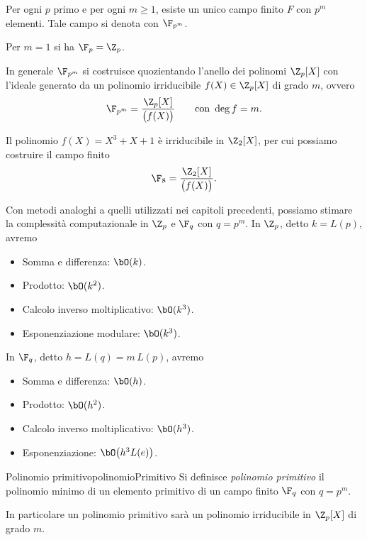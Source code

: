 	\begin{pr}
	Per ogni \(p\) primo e per ogni \(m\ge 1\), esiste un unico campo finito \(F\) con \(p^m\) elementi. Tale campo si denota con \(\F_{p^m}\).
	\end{pr}

	\begin{oss}
	Per \(m=1\) si ha \(\F_p=\Z_p\).
	\end{oss}
	\noindent
	In generale \(\F_{p^m}\) si costruisce quozientando l'anello dei polinomi \(\Z_p[X]\) con l'ideale generato da un polinomio irriducibile \(f(X)\in\Z_p[X]\) di grado \(m\), ovvero
		\[
		\F_{p^m} = \frac{\Z_p[X]}{\big(f(X)\big)} \qquad\text{con }\deg f = m.
		\]

	\begin{ese}
	Il polinomio \(f(X)=X^3+X+1\) è irriducibile in \(\Z_2[X]\), per cui possiamo costruire il campo finito
		\[
		\F_8 = \frac{\Z_2[X]}{\big(f(X)\big)}.
		\]
	\end{ese}
	\noindent
	Con metodi analoghi a quelli utilizzati nei capitoli precedenti, possiamo stimare la complessità computazionale in \(\Z_p\) e \(\F_q\) con \(q=p^m\). In \(\Z_p\), detto \(k=L(p)\), avremo
	\begin{itemize}
		\item Somma e differenza: \(\bO(k)\).
		\item Prodotto: \(\bO(k^2)\).
		\item Calcolo inverso moltiplicativo: \(\bO(k^3)\).
		\item Esponenziazione modulare: \(\bO(k^3)\).
	\end{itemize}
	In \(\F_q\), detto \(h=L(q)=m\,L(p)\), avremo
	\begin{itemize}
		\item Somma e differenza: \(\bO(h)\).
		\item Prodotto: \(\bO(h^2)\).
		\item Calcolo inverso moltiplicativo: \(\bO(h^3)\).
		\item Esponenziazione: \(\bO\big(h^3 L(e)\big)\).
	\end{itemize}

	\begin{defn}{Polinomio primitivo}{polinomioPrimitivo}
	Si definisce \emph{polinomio primitivo} il polinomio minimo di un elemento primitivo di un campo finito \(\F_q\) con \(q=p^m\).
	\end{defn}

	\begin{oss}
	In particolare un polinomio primitivo sarà un polinomio irriducibile in \(\Z_p[X]\) di grado \(m\).
	\end{oss}

